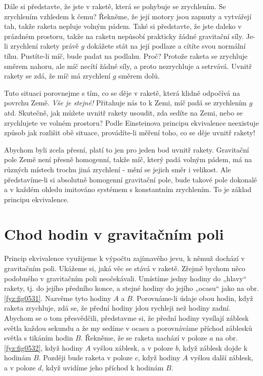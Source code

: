     Dále si představte, že jste v raketě, která se pohybuje se zrychlením. Se zrychlením vzhledem k 
    čemu? Řekněme, že její motory jsou zapnuty a vytvářejí tah, takže raketa nepluje volným pádem. 
    Také si představte, že  jste daleko v prázdném prostoru, takže na raketu nepůsobí prakticky 
    žádné gravitační síly. Je-li zrychlení rakety právě \(g\) dokážete stát na její podlaze a 
    cítíte svou normální tíhu. Pustíte-li míč, bude padat na podlahu. Proč? Protože raketa se 
    zrychluje směrem nahoru, ale míč necítí žádné síly, a proto nezrychluje a setrvává. Uvnitř 
    rakety se zdá, že míč má zrychlení \(g\) směrem dolů.
    
    Tuto situaci porovnejme s tím, co se děje v raketě, která klidně odpočívá na povrchu Země. 
    \emph{Vše je stejné!} Přitahuje nás to k Zemi, míč padá se zrychlením \(g\) atd. Skutečně, jak 
    můžete uvnitř rakety usoudit, zda sedíte na Zemi, nebo se zrychlujete ve volném prostoru? Podle 
    Einsteinova principu ekvivalence neexistuje způsob jak rozlišit obě situace, provádíte-li 
    měření toho, co se děje uvnitř rakety!
    
    Abychom byli zcela přesní, platí to jen pro jeden bod uvnitř rakety. Gravitační pole Země není 
    přesně homogenní, takže míč, který padá volným pádem, má na různých místech trochu jiná 
    zrychlení - mění se jejich směr i velikost. Ale představíme-li si absolutně homogenní 
    gravitační pole, bude takové pole dokonalé a v každém ohledu imitováno systémem s konstantním 
    zrychlením. To je základ principu ekvivalence.
    
  \section{Chod hodin v gravitačním poli}\label{fyz:IIchapXLIIsecVI}
    Princip ekvivalence využijeme k výpočtu zajímavého jevu, k němuž dochází v gravitačním poli. 
    Ukážeme si, jaká věc se stává v raketě. Zřejmě bychom něco podobného v gravitačním poli 
    neočekávali. Umístíme jedny hodiny do „hlavy“ rakety, tj. do jejího předního konce, a stejné 
    hodiny do jejího „ocasu“ jako na obr. \ref{fyz:fig0531}. Nazvěme tyto hodiny \(A\) a \(B\). 
    Porovnáme-li údaje obou hodin, když raketa zrychluje, zdá se, že přední hodiny jdou rychleji 
    než hodiny zadní. Abychom se o tom přesvědčili, představme si, že přední hodiny vysílají 
    záblesk světla každou sekundu a že my sedíme v ocasu a porovnáváme příchod záblesků světla s 
    tikáním hodin \(B\). Řekněme, že se raketa nachází v poloze \(a\) na obr. \ref{fyz:fig0532}, 
    když hodiny \(A\) vyšlou záblesk, a v poloze \(b\), když záblesk dojde k hodinám \(B\). Později 
    bude raketa v poloze \(c\), když hodiny \(A\) vyšlou další záblesk, a v poloze \(d\), když 
    uvidíme jeho příchod k hodinám \(B\).
    

